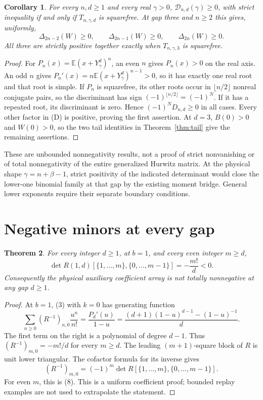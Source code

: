 \documentclass[11pt]{article}
\newtheorem{theorem}{Theorem}
\newtheorem{corollary}[theorem]{Corollary}
\begin{document}
\begin{corollary}\label{cor:top-nonnegative}
For every $n,d\ge1$ and every real $\gamma>0$,
$\mathcal D_{n,d}(\gamma)\ge0$, with strict inequality if and only
if $T_{n,\gamma,d}$ is squarefree.
At gap three and $n\ge2$ this gives, uniformly,
\[
 \Delta_{2n-2}(W)\ge0,\qquad
 \Delta_{2n-1}(W)\ge0,\qquad \Delta_{2n}(W)\ge0.
\]
All three are strictly positive together exactly when $T_{n,\gamma,3}$
is squarefree.
\end{corollary}
\begin{proof}
For $P_n(x)=\mathbb E(x+Y_\gamma^d)^n$, an even $n$ gives
$P_n(x)>0$ on the real axis. An odd $n$ gives
$P_n'(x)=n\mathbb E(x+Y_\gamma^d)^{n-1}>0$, so it has exactly
one real root and that root is simple.
If $P_n$ is squarefree, its other roots occur in
$\lfloor n/2\rfloor$ nonreal conjugate pairs, so the discriminant
has sign $(-1)^{\lfloor n/2\rfloor}=(-1)^N$.
If it has a repeated root, its discriminant is zero.
Hence $(-1)^ND_{n,d}\ge0$ in all cases.
Every other factor in (D) is positive, proving the first assertion.
At $d=3$, $B(0)>0$ and $W(0)>0$, so the two tail identities
in Theorem~\ref{thm:tail} give the remaining assertions.
\end{proof}

These are unbounded nonnegativity results, not a proof of strict
nonvanishing or of total nonnegativity of the entire generalized
Hurwitz matrix. At the physical shape $\gamma=n+\beta-1$,
strict positivity of the indicated determinant would close the
lower-one binomial family at that gap by the existing moment bridge.
General lower exponents require their separate boundary conditions.

\section{Negative minors at every gap}
\begin{theorem}\label{thm:negative}
For every integer $d\ge1$, at $b=1$, and every even integer $m\ge d$,
\[
 \det R(1,d)[\{1,\ldots,m\},\{0,\ldots,m-1\}]
                         =-\frac{m!}{d}<0.                 \tag{8}
\]
Consequently the physical auxiliary coefficient array is not totally
nonnegative at any gap $d\ge1$.
\end{theorem}
\begin{proof}
At $b=1$, (3) with $k=0$ has generating function
\[
 \sum_{n\ge0}(R^{-1})_{n,0}\frac{u^n}{n!}
 =\frac{P_d'(u)}{1-u}
 =\frac{(d+1)(1-u)^{d-1}-(1-u)^{-1}}d.
\]
The first term on the right is a polynomial of degree $d-1$.
Thus $(R^{-1})_{m,0}=-m!/d$ for every $m\ge d$.
The leading $(m+1)$-square block of $R$ is unit lower triangular.
The cofactor formula for its inverse gives
\[
 (R^{-1})_{m,0}=(-1)^m
       \det R[\{1,\ldots,m\},\{0,\ldots,m-1\}].
\]
For even $m$, this is (8). This is a uniform coefficient proof;
bounded replay examples are not used to extrapolate the statement.
\end{proof}
\end{document}
